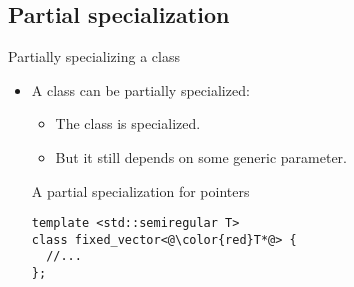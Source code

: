 \subsection{Partial specialization}

\begin{frame}[t,fragile]{Partially specializing a class}
\begin{itemize}
  \item A class can be partially specialized:
    \begin{itemize}
      \item The class is specialized.
      \item But it still depends on some generic parameter.
    \end{itemize}

\begin{block}{A partial specialization for pointers}
\begin{lstlisting}[escapechar=@]
template <std::semiregular T>
class fixed_vector<@\color{red}T*@> {
  //...
};
\end{lstlisting}
\end{block}

\end{itemize}
\end{frame}

